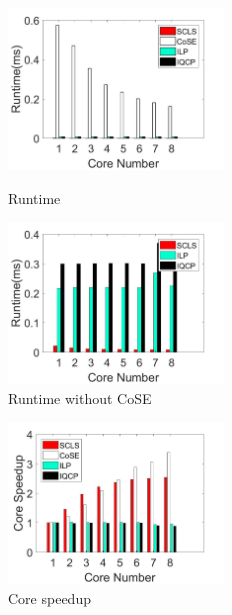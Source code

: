 \begin{figure}[tp]
\centering
\begin{minipage}[t]{0.3\linewidth}
\centering
\includegraphics[width=2.25in]{figures/runtime}
\caption{Runtime}
\label{fig:normalization runtime}
\end{minipage}
\hfill
\begin{minipage}[t]{0.3\linewidth}
\centering
\includegraphics[width=2.25in]{figures/Runtime_noKSP_noCOSE}\\
  \caption{Runtime without CoSE}\label{fig:Runtime_noKSP_noCOSE}
\end{minipage}
\hfill
\begin{minipage}[t]{0.3\linewidth}
\centering
\includegraphics[width=2.25in]{figures/speedup}
\caption{Core speedup}
\label{fig:Speedup}
\end{minipage}
\end{figure}


